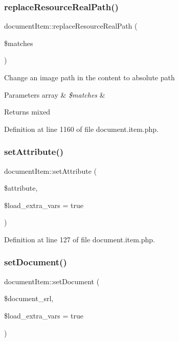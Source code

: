 \subsubsection{\texorpdfstring{replace\+Resource\+Real\+Path()}{replaceResourceRealPath()}}
{\footnotesize\ttfamily document\+Item\+::replace\+Resource\+Real\+Path (\begin{DoxyParamCaption}\item[{}]{\$matches }\end{DoxyParamCaption})}

Change an image path in the content to absolute path 
\begin{DoxyParams}[1]{Parameters}
array & {\em \$matches} & \\
\hline
\end{DoxyParams}
\begin{DoxyReturn}{Returns}
mixed 
\end{DoxyReturn}


Definition at line 1160 of file document.\+item.\+php.

\mbox{\label{classdocumentItem_a456494e6f2ba42f247a1dec402b3ff3a}} 
\subsubsection{\texorpdfstring{set\+Attribute()}{setAttribute()}}
{\footnotesize\ttfamily document\+Item\+::set\+Attribute (\begin{DoxyParamCaption}\item[{}]{\$attribute,  }\item[{}]{\$load\+\_\+extra\+\_\+vars = {\ttfamily true} }\end{DoxyParamCaption})}



Definition at line 127 of file document.\+item.\+php.

\mbox{\label{classdocumentItem_a2ea6b3cbf877ed27bc0f0ab935d35e97}} 
\subsubsection{\texorpdfstring{set\+Document()}{setDocument()}}
{\footnotesize\ttfamily document\+Item\+::set\+Document (\begin{DoxyParamCaption}\item[{}]{\$document\+\_\+srl,  }\item[{}]{\$load\+\_\+extra\+\_\+vars = {\ttfamily true} }\end{DoxyParamCaption})}



